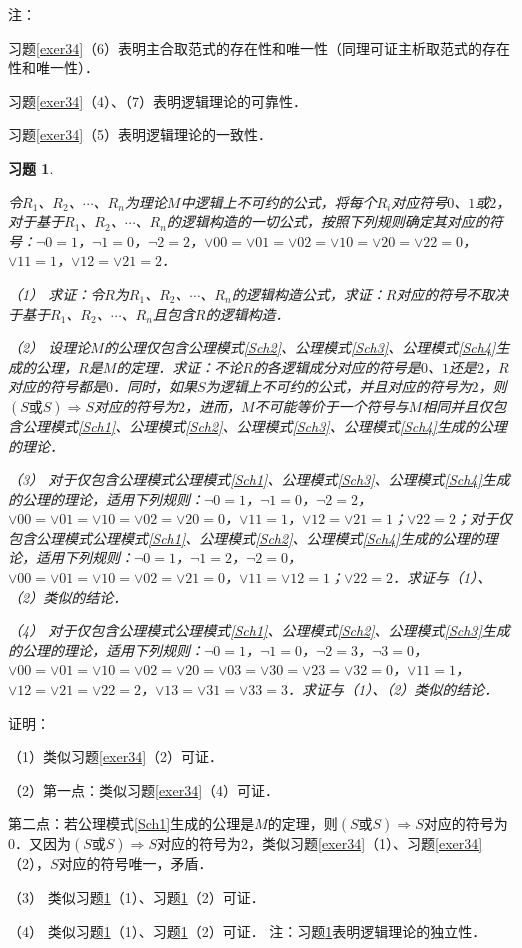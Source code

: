 \documentclass[12pt, a4paper, oneside]{book}
\newtheorem{exer}{习题}
\begin{document}
			\par
			注：
			\par
			习题\ref{exer34}（6）表明主合取范式的存在性和唯一性（同理可证主析取范式的存在性和唯一性）．
			\par
			习题\ref{exer34}（4）、（7）表明逻辑理论的可靠性．
			\par
			习题\ref{exer34}（5）表明逻辑理论的一致性．
			
			\begin{exer}\label{exer35}
				\hfill\par
				令$R_1$、$R_2$、$\cdots$、$R_n$为理论$M$中逻辑上不可约的公式，将每个$R_i$对应符号$0$、$1$或$2$，对于基于$R_1$、$R_2$、$\cdots$、$R_n$的逻辑构造的一切公式，按照下列规则确定其对应的符号：$\neg 0=1$，$\neg 1=0$，$\neg 2=2$，$\lor 00=\lor 01=\lor 02=\lor 10=\lor 20=\lor 22=0$，$\lor 11=1$，$\lor 12=\lor 21=2$．
				\par
				（1）	求证：令$R$为$R_1$、$R_2$、$\cdots$、$R_n$的逻辑构造公式，求证：$R$对应的符号不取决于基于$R_1$、$R_2$、$\cdots$、$R_n$且包含$R$的逻辑构造．
				\par
				（2）	设理论$M$的公理仅包含公理模式\ref{Sch2}、公理模式\ref{Sch3}、公理模式\ref{Sch4}生成的公理，$R$是$M$的定理．求证：不论$R$的各逻辑成分对应的符号是$0$、$1$还是$2$，$R$对应的符号都是$0$．同时，如果$S$为逻辑上不可约的公式，并且对应的符号为$2$，则$(S\text{或}S)\Rightarrow S$对应的符号为$2$，进而，$M$不可能等价于一个符号与$M$相同并且仅包含公理模式\ref{Sch1}、公理模式\ref{Sch2}、公理模式\ref{Sch3}、公理模式\ref{Sch4}生成的公理的理论．
				\par
				（3）	对于仅包含公理模式公理模式\ref{Sch1}、公理模式\ref{Sch3}、公理模式\ref{Sch4}生成的公理的理论，适用下列规则：$\neg 0=1$，$\neg 1=0$，$\neg 2=2$，$\lor 00=\lor 01=\lor 10=\lor 02=\lor 20=0$，$\lor 11=1$，$\lor 12=\lor 21=1$；$\lor 22=2$；对于仅包含公理模式公理模式\ref{Sch1}、公理模式\ref{Sch2}、公理模式\ref{Sch4}生成的公理的理论，适用下列规则：$\neg 0=1$，$\neg 1=2$，$\neg 2=0$，$\lor 00=\lor 01=\lor 10=\lor 02=\lor 21=0$，$\lor 11=\lor 12=1$；$\lor 22=2$．求证与（1）、（2）类似的结论．
				\par
				（4）	对于仅包含公理模式公理模式\ref{Sch1}、公理模式\ref{Sch2}、公理模式\ref{Sch3}生成的公理的理论，适用下列规则：$\neg 0=1$，$\neg 1=0$，$\neg 2=3$，$\neg 3=0$，$\lor 00=\lor 01=\lor 10=\lor 02=\lor 20=\lor 03=\lor 30=\lor 23=\lor 32=0$，$\lor 11=1$，$\lor 12=\lor 21=\lor 22=2$，$\lor 13=\lor 31=\lor 33=3$．求证与（1）、（2）类似的结论．
			\end{exer}
			证明：
			\par
			（1）类似习题\ref{exer34}（2）可证．
			\par
			（2）第一点：类似习题\ref{exer34}（4）可证．
			\par
			第二点：若公理模式\ref{Sch1}生成的公理是$M$的定理，则$(S\text{或}S)\Rightarrow S$对应的符号为$0$．又因为$(S\text{或}S)\Rightarrow S$对应的符号为2，类似习题\ref{exer34}（1）、习题\ref{exer34}（2），$S$对应的符号唯一，矛盾．
			\par
			（3）	类似习题\ref{exer35}（1）、习题\ref{exer35}（2）可证．
			\par
			（4）	类似习题\ref{exer35}（1）、习题\ref{exer35}（2）可证．
			注：习题\ref{exer35}表明逻辑理论的独立性．
\end{document}

